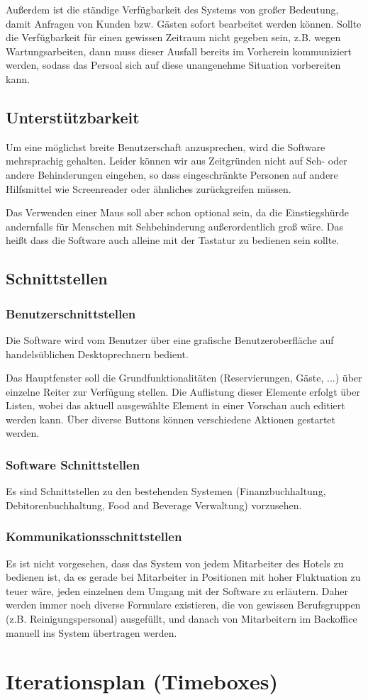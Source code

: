\documentclass[10pt,a4paper,titlepage]{article}
\begin{document}
Außerdem ist die ständige Verfügbarkeit des Systems von großer Bedeutung, damit Anfragen von Kunden bzw. Gästen sofort bearbeitet werden können. Sollte die Verfügbarkeit für einen gewissen Zeitraum nicht gegeben sein, z.B. wegen Wartungsarbeiten, dann muss dieser Ausfall bereits im Vorherein kommuniziert werden, sodass das Persoal sich auf diese unangenehme Situation vorbereiten kann.
\subsection{Unterstützbarkeit}
Um eine möglichst breite Benutzerschaft anzusprechen, wird die Software mehrsprachig gehalten. Leider können wir aus Zeitgründen nicht auf Seh- oder andere Behinderungen eingehen, so dass eingeschränkte Personen auf andere Hilfsmittel wie Screenreader oder ähnliches zurückgreifen müssen.

Das Verwenden einer Maus soll aber schon optional sein, da die Einstiegshürde andernfalls für Menschen mit Sehbehinderung außerordentlich groß wäre. Das heißt dass die Software auch alleine mit der Tastatur zu bedienen sein sollte.
\subsection{Schnittstellen}
\subsubsection{Benutzerschnittstellen}
Die Software wird vom Benutzer über eine grafische Benutzeroberfläche auf handelsüblichen Desktoprechnern bedient.

Das Hauptfenster soll die Grundfunktionalitäten (Reservierungen, Gäste, ...) über einzelne Reiter zur Verfügung stellen. Die Auflistung dieser Elemente erfolgt über Listen, wobei das aktuell ausgewählte Element in einer Vorschau auch editiert werden kann. Über diverse Buttons können verschiedene Aktionen gestartet werden.
\subsubsection{Software Schnittstellen}
Es sind Schnittstellen zu den bestehenden Systemen (Finanzbuchhaltung, Debitorenbuchhaltung, Food and Beverage Verwaltung) vorzusehen.
\subsubsection{Kommunikationsschnittstellen}
Es ist nicht vorgesehen, dass das System von jedem Mitarbeiter des Hotels zu bedienen ist, da es gerade bei Mitarbeiter in Positionen mit hoher Fluktuation zu teuer wäre, jeden einzelnen dem Umgang mit der Software zu erläutern. Daher werden immer noch diverse Formulare existieren, die von gewissen Berufsgruppen (z.B. Reinigungspersonal) ausgefüllt, und danach von Mitarbeitern im Backoffice manuell ins System übertragen werden.

\newpage

\section{Iterationsplan (Timeboxes)}

\newpage

\printglossary[title=Glossar,toctitle=GLOSSAR]
\end{document}
